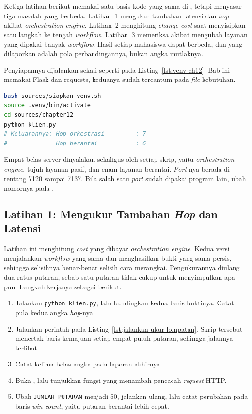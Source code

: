 Ketiga latihan berikut memakai satu basis kode yang sama di
, tetapi menyasar tiga masalah yang berbeda.
Latihan~1 mengukur tambahan latensi dan \textit{hop} akibat \textit{orchestration engine}.
Latihan~2 menghitung \textit{change cost} saat menyisipkan satu langkah ke
tengah \textit{workflow}.
Latihan~3 memeriksa akibat mengubah layanan yang dipakai banyak \textit{workflow}.
Hasil setiap mahasiswa dapat berbeda, dan yang dilaporkan adalah pola
perbandingannya, bukan angka mutlaknya.

Penyiapannya dijalankan sekali seperti pada Listing~\ref{lst:venv-ch12}. Bab
ini memakai Flask dan requests, keduanya sudah tercantum pada \textit{file} kebutuhan.

\begin{lstlisting}[language=bash, caption={Menyiapkan bahan sebelum ketiga
  latihan, seluruh skrip tersedia di \berkas{sources/chapter12/}},
  label=lst:venv-ch12]
bash sources/siapkan_venv.sh
source .venv/bin/activate
cd sources/chapter12
python klien.py
# Keluarannya: Hop orkestrasi         : 7
#              Hop berantai           : 6
\end{lstlisting}

Empat belas server dinyalakan sekaligus oleh setiap skrip, yaitu
\textit{orchestration engine}, tujuh layanan pasif, dan enam layanan berantai.
\textit{Port}-nya berada di rentang 7120 sampai 7137. Bila salah satu \textit{port} sudah dipakai program lain,
ubah nomornya pada .

\subsection*{Latihan 1: Mengukur Tambahan \textit{Hop} dan Latensi}

Latihan ini menghitung \textit{cost} yang dibayar \textit{orchestration engine}. Kedua versi
menjalankan \textit{workflow} yang sama dan menghasilkan bukti yang sama persis,
sehingga selisihnya benar-benar selisih cara merangkai. Pengukurannya diulang
dua ratus putaran, sebab satu putaran tidak cukup untuk menyimpulkan apa pun.
Langkah kerjanya sebagai berikut.

\begin{enumerate}
  \item Jalankan \texttt{python klien.py}, lalu bandingkan kedua baris
    buktinya. Catat pula kedua angka \textit{hop}-nya.
  \item Jalankan perintah pada Listing~\ref{lst:jalankan-ukur-lompatan}. Skrip
    tersebut mencetak baris kemajuan setiap empat puluh putaran, sehingga
    jalannya terlihat.
  \item Catat kelima belas angka pada laporan akhirnya.
  \item Buka , lalu tunjukkan fungsi yang
    menambah pencacah \textit{request} HTTP.
  \item Ubah \texttt{JUMLAH\_PUTARAN} menjadi 50, jalankan ulang, lalu catat
    perubahan pada baris \textit{win count}, yaitu putaran berantai lebih
    cepat.
\end{enumerate}

